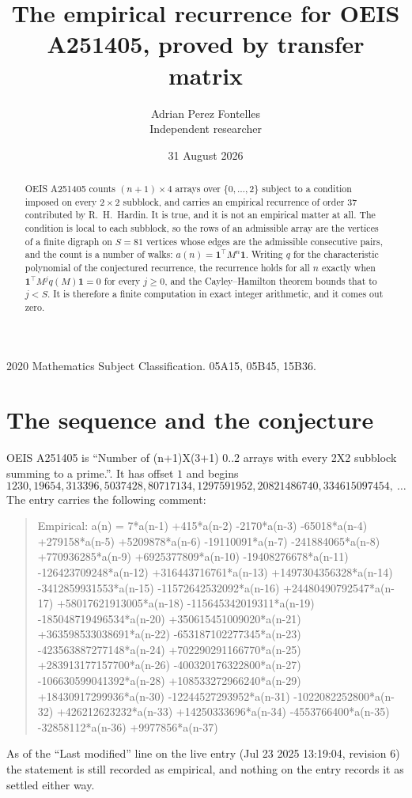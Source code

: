 \documentclass[11pt,a4paper]{article}
\title{The empirical recurrence for OEIS A251405, proved by transfer matrix}
\author{Adrian Perez Fontelles\\ \small Independent researcher}
\date{31 August 2026}
\theoremstyle{plain}
\theoremstyle{definition}
\begin{document}
\maketitle

\begin{abstract}
OEIS A251405 counts $(n+1)\times4$ arrays over $\{0,\dots,2\}$ subject to a condition imposed on
every $2\times2$ subblock, and carries an empirical recurrence of order $37$ contributed
by R.~H.~Hardin. It is true, and it is not an empirical matter at all. The condition is local
to each subblock, so the rows of an admissible array are the vertices of a finite digraph
on $S=81$ vertices whose edges are the admissible consecutive pairs, and the count is a
number of walks: $a(n)=\mathbf{1}^{\!\top}M^{n}\mathbf{1}$. Writing $q$
for the characteristic polynomial of the conjectured recurrence, the recurrence holds for all
$n$ exactly when $\mathbf{1}^{\!\top}M^{j}q(M)\mathbf{1}=0$ for every $j\ge0$, and the
Cayley--Hamilton theorem bounds that to $j<S$. It is therefore a finite computation in exact
integer arithmetic, and it comes out zero.
\end{abstract}

\noindent\small 2020 Mathematics Subject Classification. 05A15, 05B45, 15B36.\normalsize

\section{The sequence and the conjecture}

OEIS A251405 is ``Number of (n+1)X(3+1) 0..2 arrays with every 2X2 subblock summing to a prime.''. It has offset $1$ and begins
\[
1230, 19654, 313396, 5037428, 80717134, 1297591952, 20821486740, 334615097454,\ \dots
\]
The entry carries the following comment:
\begin{quote}\small
Empirical: a(n) = 7*a(n-1) +415*a(n-2) -2170*a(n-3) -65018*a(n-4) +279158*a(n-5) +5209878*a(n-6) -19110091*a(n-7) -241884065*a(n-8) +770936285*a(n-9) +6925377809*a(n-10) -19408276678*a(n-11) -126423709248*a(n-12) +316443716761*a(n-13) +1497304356328*a(n-14) -3412859931553*a(n-15) -11572642532092*a(n-16) +24480490792547*a(n-17) +58017621913005*a(n-18) -115645342019311*a(n-19) -185048719496534*a(n-20) +350615451009020*a(n-21) +363598533038691*a(n-22) -653187102277345*a(n-23) -423563887277148*a(n-24) +702290291166770*a(n-25) +283913177157700*a(n-26) -400320176322800*a(n-27) -106630599041392*a(n-28) +108533272966240*a(n-29) +18430917299936*a(n-30) -12244527293952*a(n-31) -1022082252800*a(n-32) +426212623232*a(n-33) +14250333696*a(n-34) -4553766400*a(n-35) -32858112*a(n-36) +9977856*a(n-37)
\end{quote}
As of the ``Last modified'' line on the live entry (Jul 23 2025 13:19:04, revision 6) the statement is
still recorded as empirical, and nothing on the entry records it as settled either way.
\end{document}
